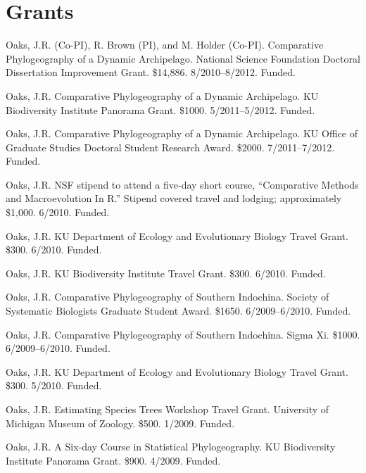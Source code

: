 \documentclass[10pt]{article}
\newcommand{\ignore}[1]{}
\newcommand{\myHangIndent}{\hangindent=5mm}
\begin{document}
\section*{Grants}
\myHangIndent
Oaks, J.R. (Co-PI), R. Brown (PI), and M. Holder (Co-PI).
Comparative Phylogeography of a Dynamic Archipelago.
National Science Foundation Doctoral Dissertation Improvement Grant.
\$14,886.
8/2010--8/2012.
Funded.

\myHangIndent
Oaks, J.R.
Comparative Phylogeography of a Dynamic Archipelago.
KU Biodiversity Institute Panorama Grant.
\$1000.
5/2011--5/2012.
Funded.

\myHangIndent
Oaks, J.R.
Comparative Phylogeography of a Dynamic Archipelago.
KU Office of Graduate Studies Doctoral Student Research Award.
\$2000.
7/2011--7/2012.
Funded.

\ignore{
\myHangIndent
Oaks, J.R.
Comparative Phylogeography of a Dynamic Archipelago.
The Society for the Study of Evolution Rosemary Grant Graduate Research Award.
\$2,085.
7/2010--7/2011.
Not funded.
}
\myHangIndent
Oaks, J.R.
NSF stipend to attend a five-day short course, ``Comparative Methods and
Macroevolution In R.''
Stipend covered travel and lodging; approximately \$1,000.
6/2010.
Funded.

\myHangIndent
Oaks, J.R.
KU Department of Ecology and Evolutionary Biology Travel Grant.
\$300.
6/2010.
Funded.

\myHangIndent
Oaks, J.R.
KU Biodiversity Institute Travel Grant.
\$300.
6/2010.
Funded.

\myHangIndent
Oaks, J.R.
Comparative Phylogeography of Southern Indochina.
Society of Systematic Biologists Graduate Student Award.
\$1650.
6/2009--6/2010.
Funded.

\myHangIndent
Oaks, J.R.
Comparative Phylogeography of Southern Indochina.
Sigma Xi.
\$1000.
6/2009--6/2010.
Funded.

\ignore{
\myHangIndent
Oaks, J.R.
Comparative Phylogeography of Southern Indochina.
The Society for the Study of Amphibians and Reptiles Dean E. Metter Award.
\$800.
6/2009--6/2010.
Not funded.
}
\myHangIndent
Oaks, J.R.
KU Department of Ecology and Evolutionary Biology Travel Grant.
\$300.
5/2010.
Funded.

\myHangIndent
Oaks, J.R.
Estimating Species Trees Workshop Travel Grant.
University of Michigan Museum of Zoology.
\$500.
1/2009.
Funded.

\myHangIndent
Oaks, J.R.
A Six-day Course in Statistical Phylogeography.
KU Biodiversity Institute Panorama Grant.
\$900.
4/2009.
Funded.
\end{document}

